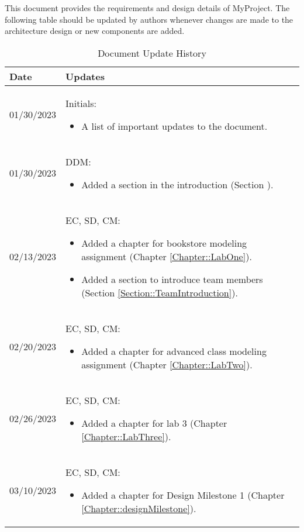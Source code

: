 This document provides the requirements and design details of MyProject.
The following table should be
updated by authors whenever changes are made to the architecture
design or new components are added.

\begin{longtable}{|l||p{13.5cm}|}
	\caption{Document Update History \label{Table::UpdateHistory}} \\
	\hline
	\textbf{Date} & \textbf{Updates}                               \\
	\hline
	\endhead

	01/30/2023    & Initials:
	\begin{itemize}[topsep=0pt,itemsep=0pt,parsep=0pt,partopsep=0pt,leftmargin=12pt]
		\item A list of important updates to the document.
	\end{itemize}
	\\ \hline

	01/30/2023    & DDM:
	\begin{itemize}[topsep=0pt,itemsep=0pt,parsep=0pt,partopsep=0pt,leftmargin=12pt]
		\item Added a section in the introduction (Section ). %
	\end{itemize}
	\\ \hline

	02/13/2023    & EC, SD, CM:
	\begin{itemize}[topsep=0pt,itemsep=0pt,parsep=0pt,partopsep=0pt,leftmargin=12pt]
		\item Added a chapter for bookstore modeling assignment (Chapter \ref{Chapter::LabOne}).
		\item Added a section to introduce team members (Section \ref{Section::TeamIntroduction}).
	\end{itemize}
	\\ \hline

	02/20/2023    & EC, SD, CM:
	\begin{itemize}[topsep=0pt,itemsep=0pt,parsep=0pt,partopsep=0pt,leftmargin=12pt]
		\item Added a chapter for advanced class modeling assignment (Chapter \ref{Chapter::LabTwo}).
	\end{itemize}
	\\ \hline

	02/26/2023    & EC, SD, CM:
	\begin{itemize}[topsep=0pt,itemsep=0pt,parsep=0pt,partopsep=0pt,leftmargin=12pt]
		\item Added a chapter for lab 3 (Chapter \ref{Chapter::LabThree}).
	\end{itemize}
	\\ \hline
 	03/10/2023    & EC, SD, CM:
	\begin{itemize}[topsep=0pt,itemsep=0pt,parsep=0pt,partopsep=0pt,leftmargin=12pt]
		\item Added a chapter for Design Milestone 1 (Chapter \ref{Chapter::designMilestone}).
	\end{itemize}
	\\ \hline
\end{longtable}